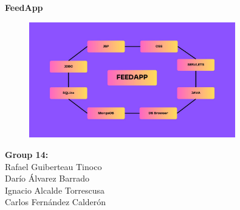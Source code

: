 \begin{titlepage}
\label{cover}
    \centering
    {\Huge \textbf{FeedApp}\par} 
    \vspace{2cm} 

    \begin{figure}[h!]
        \centering
        \includegraphics[width=0.8\textwidth]{figs/cover.jpg}  
    \end{figure}

    \vspace{2cm} 
    \noindent
    \textbf{Group 14:} \\
    Rafael Guiberteau Tinoco \\
    Darío Álvarez Barrado \\
    Ignacio Alcalde Torrescusa \\
    Carlos Fernández Calderón
\end{titlepage}